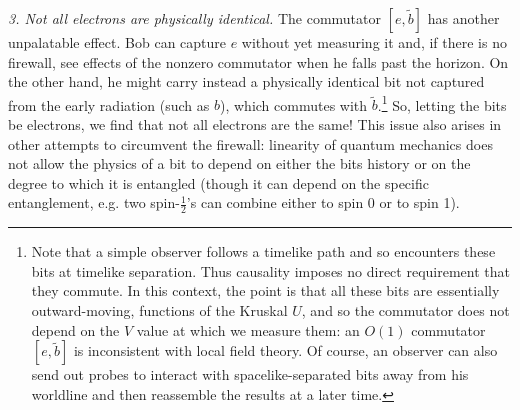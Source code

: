 \documentclass[12pt]{article}
\begin{document}
{\it 3.  Not all electrons are physically identical.}  The commutator $[e,\tilde b]$ has another unpalatable effect.  Bob can capture $e$ without yet measuring it and, if there is no firewall, see effects of the nonzero commutator when he falls past the horizon.  On the other hand, he might carry instead a physically identical bit not captured from the early radiation (such as $b$), which commutes with $\tilde b$.\footnote{{Note that a simple observer follows a timelike path and so encounters these bits at timelike separation. Thus causality imposes no direct requirement that they commute.  In this context, the point is that all these
 bits are essentially outward-moving, functions of the Kruskal $U$, and so the commutator does not depend on the $V$ value at which we measure them: an $O(1)$ commutator $[e,\tilde b]$ is inconsistent with local field theory.  Of course, an observer can also send out probes to interact with spacelike-separated bits away from his worldline and then reassemble the results at a later time.}}
  So, letting the bits be electrons, we find that not all electrons are the same!  This issue also arises in other attempts to circumvent the firewall: linearity of quantum mechanics does not allow the {physics of} a bit to depend on either the bits history or on the degree to which it is entangled (though it can depend on the specific entanglement, e.g. two spin-$\frac12$'s can combine either to spin 0 or to spin 1).
\end{document}
